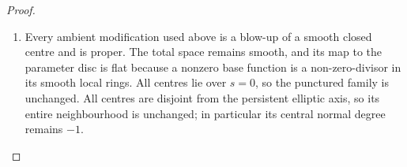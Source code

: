 \begin{proof}
\begin{enumerate}[label=\arabic*.,leftmargin=*]
\item Every ambient modification used above is a blow-up of a smooth
closed centre and is proper.  The total space remains smooth,
and its map to the parameter disc is flat because a nonzero
base function is a non-zero-divisor in its smooth local rings.
All centres lie over $s=0$, so the punctured family is unchanged.
All centres are disjoint from the persistent elliptic axis,
so its entire neighbourhood is unchanged; in particular its
central normal degree remains $-1$.

\end{enumerate}
\end{proof}
